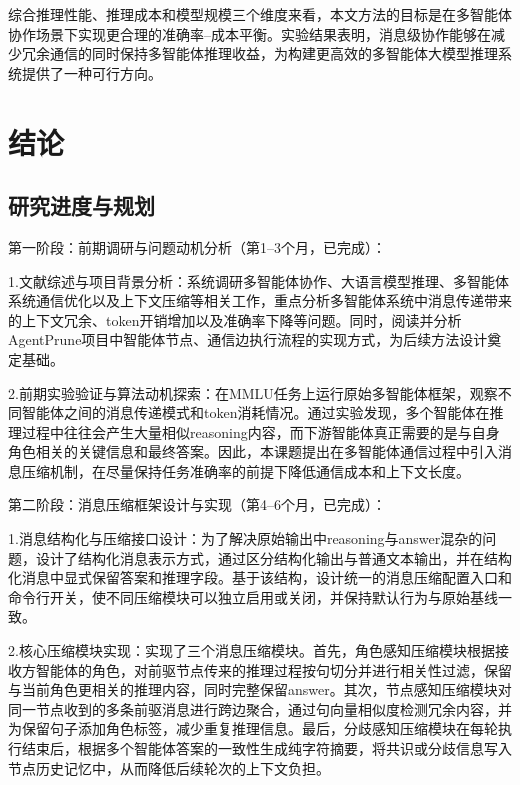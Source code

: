 \documentclass[11pt, a4paper]{article}
\numberwithin{figure}{section}
\begin{document}
综合推理性能、推理成本和模型规模三个维度来看，本文方法的目标是在多智能体协作场景下实现更合理的准确率--成本平衡。实验结果表明，消息级协作能够在减少冗余通信的同时保持多智能体推理收益，为构建更高效的多智能体大模型推理系统提供了一种可行方向。






\newpage



\section{结论}

\subsection{研究进度与规划}

第一阶段：前期调研与问题动机分析（第1--3个月，已完成）：

1.文献综述与项目背景分析：系统调研多智能体协作、大语言模型推理、多智能体系统通信优化以及上下文压缩等相关工作，重点分析多智能体系统中消息传递带来的上下文冗余、token开销增加以及准确率下降等问题。同时，阅读并分析AgentPrune项目中智能体节点、通信边执行流程的实现方式，为后续方法设计奠定基础。

2.前期实验验证与算法动机探索：在MMLU任务上运行原始多智能体框架，观察不同智能体之间的消息传递模式和token消耗情况。通过实验发现，多个智能体在推理过程中往往会产生大量相似reasoning内容，而下游智能体真正需要的是与自身角色相关的关键信息和最终答案。因此，本课题提出在多智能体通信过程中引入消息压缩机制，在尽量保持任务准确率的前提下降低通信成本和上下文长度。

第二阶段：消息压缩框架设计与实现（第4--6个月，已完成）：

1.消息结构化与压缩接口设计：为了解决原始输出中reasoning与answer混杂的问题，设计了结构化消息表示方式，通过区分结构化输出与普通文本输出，并在结构化消息中显式保留答案和推理字段。基于该结构，设计统一的消息压缩配置入口和命令行开关，使不同压缩模块可以独立启用或关闭，并保持默认行为与原始基线一致。

2.核心压缩模块实现：实现了三个消息压缩模块。首先，角色感知压缩模块根据接收方智能体的角色，对前驱节点传来的推理过程按句切分并进行相关性过滤，保留与当前角色更相关的推理内容，同时完整保留answer。其次，节点感知压缩模块对同一节点收到的多条前驱消息进行跨边聚合，通过句向量相似度检测冗余内容，并为保留句子添加角色标签，减少重复推理信息。最后，分歧感知压缩模块在每轮执行结束后，根据多个智能体答案的一致性生成纯字符摘要，将共识或分歧信息写入节点历史记忆中，从而降低后续轮次的上下文负担。
\end{document}
